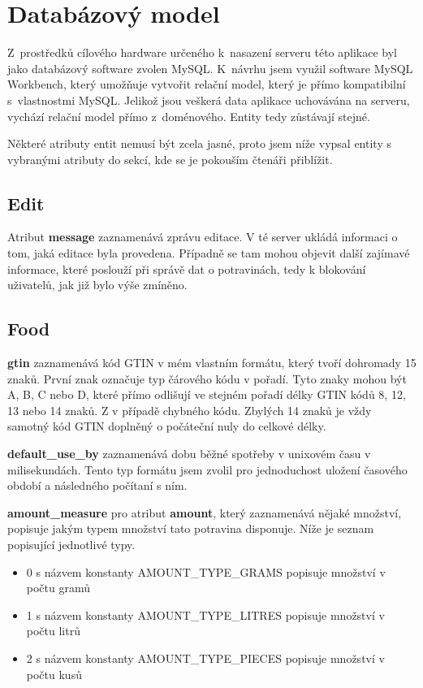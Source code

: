 \documentclass[thesis=B,czech]{FITthesis}[2013/10/20]
\begin{document}
\section{Databázový model}

Z~prostředků cílového hardware určeného k~nasazení serveru této aplikace byl jako databázový software zvolen MySQL. K~návrhu jsem využil software MySQL Workbench, který umožňuje vytvořit relační model, který je přímo kompatibilní s~vlastnostmi MySQL. Jelikož jsou veškerá data aplikace uchovávána na serveru, vychází relační model přímo z~doménového. Entity tedy zůstávají stejné.

Některé atributy entit nemusí být zcela jasné, proto jsem níže vypsal entity s vybranými atributy do sekcí, kde se je pokouším čtenáři přiblížit.

\subsection{Edit}

Atribut \textbf{message} zaznamenává zprávu editace. V té server ukládá informaci o tom, jaká editace byla provedena. Případně se tam mohou objevit další zajímavé informace, které poslouží při správě dat o potravinách, tedy k blokování uživatelů, jak již bylo výše zmíněno.

\subsection{Food}

\textbf{gtin} zaznamenává kód GTIN v mém vlastním formátu, který tvoří dohromady 15 znaků. První znak označuje typ čárového kódu v pořadí. Tyto znaky mohou být A, B, C nebo D, které přímo odlišují ve stejném pořadí délky GTIN kódů 8, 12, 13 nebo 14 znaků. Z v případě chybného kódu. Zbylých 14 znaků je vždy samotný kód GTIN doplněný o počáteční nuly do celkové délky.

\textbf{default\_use\_by} zaznamenává dobu běžné spotřeby v unixovém času v milisekundách. Tento typ formátu jsem zvolil pro jednoduchost uložení časového období a následného počítaní s ním.

\textbf{amount\_measure} pro atribut \textbf{amount}, který zaznamenává nějaké množství, popisuje jakým typem množství tato potravina disponuje. Níže je seznam popisující jednotlivé typy.

\begin{itemize}
  \item 0 s názvem konstanty AMOUNT\_TYPE\_GRAMS popisuje množství v počtu gramů
  \item 1 s názvem konstanty AMOUNT\_TYPE\_LITRES popisuje množství v počtu litrů
  \item 2 s názvem konstanty AMOUNT\_TYPE\_PIECES popisuje množství v počtu kusů
\end{itemize}
\end{document}
